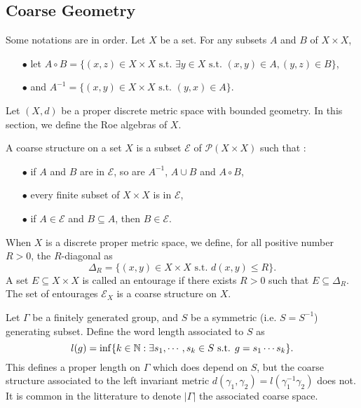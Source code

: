 \subsection{Coarse Geometry}

Some notations are in order. Let $X$ be a set. For any subsets $A$ and $B$ of $X\times X$, 
\begin{itemize}
\item[$\bullet$] let $A\circ B = \{(x,z)\in X\times X \text{ s.t. } \exists y\in X\text{ s.t. } (x,y)\in A, (y,z)\in B\}$,
\item[$\bullet$] and $A^{-1} = \{(x,y)\in X\times X \text{ s.t. } (y,x)\in A\}$.\\
\end{itemize}

Let $(X,d)$ be a proper discrete metric space with bounded geometry. In this section, we define the Roe algebras of $X$.

\begin{definition}\cite{RoeCoarse}
A coarse structure on a set $X$ is a subset $\mathcal E$ of $\mathcal P(X\times X)$ such that :
\begin{itemize}
\item[$\bullet$] if $A$ and $B$ are in $\mathcal E$, so are $A^{-1}$, $A\cup B$ and $A\circ B$,
\item[$\bullet$] every finite subset of $X\times X$ is in $\mathcal E$,
\item[$\bullet$] if $A\in\mathcal E$ and $B\subseteq A$, then $B\in \mathcal E$.
\end{itemize}
\end{definition} 

\begin{Expl}
When $X$ is a discrete proper metric space, we define, for all positive number $R>0$, the $R$-diagonal as 
\[\Delta_R= \{(x,y)\in X\times X \text{ s.t. } d(x,y)\leq R\}.\]
A set $E\subseteq X\times X$ is called an entourage if there exists $R>0$ such that $E\subseteq \Delta_R$. The set of entourages $\mathcal E_X$ is a coarse structure on $X$.
\end{Expl}

\begin{Expl} Let $\Gamma$ be a finitely generated group, and $S$ be a symmetric (i.e. $S=S^{-1}$) generating subset. Define the word length associated to $S$ as 
\[l(g) = \inf\{ k\in \mathbb N : \exists s_1,\cdots,s_k\in S \text{ s.t. } g= s_1 \cdots s_k\}.\]
This defines a proper length on $\Gamma$ which does depend on $S$, but the coarse structure associated to the left invariant metric $d(\gamma_1,\gamma_2)= l(\gamma_1^{-1}\gamma_2)$ does not. It is common in the litterature to denote $|\Gamma|$ the  associated coarse space.
\end{Expl}

